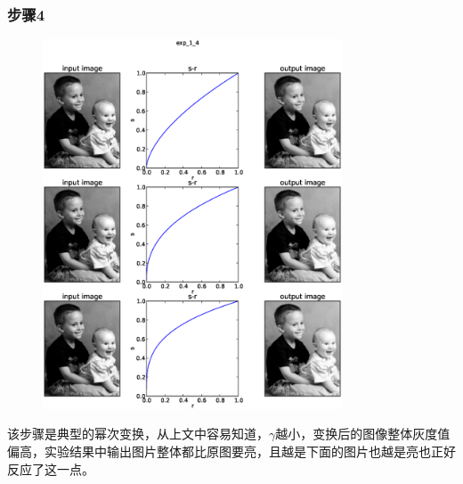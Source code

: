 \documentclass[]{IEEEphot}
\begin{document}
\subsubsection{步骤4}
\begin{figure}[h]
\centering
\includegraphics[width=21pc]{exp_1_4.eps}\\
\label{fig_env2}
\end{figure}
该步骤是典型的幂次变换，从上文中容易知道，$\gamma$越小，变换后的图像整体灰度值偏高，实验结果中输出图片整体都比原图要亮，且越是下面的图片也越是亮也正好反应了这一点。
\end{document}

